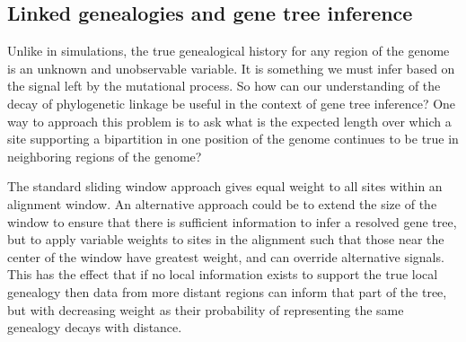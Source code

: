 \documentclass[11pt]{article}
\begin{document}


 
\subsection{Linked genealogies and gene tree inference}

Unlike in simulations, the true genealogical history for any region of the genome is an unknown and unobservable variable. It is something we must infer based on the signal left by the mutational process. So how can our understanding of the decay of phylogenetic linkage be useful in the context of gene tree inference? One way to approach this problem is to ask what is the expected length over which a site supporting a bipartition in one position of the genome continues to be true in neighboring regions of the genome? 

The standard sliding window approach gives equal weight to all sites within an alignment window. An alternative approach could be to extend the size of the window to ensure that there is sufficient information to infer a resolved gene tree, but to apply variable weights to sites in the alignment such that those near the center of the window have greatest weight, and can override alternative signals. This has the effect that if no local information exists to support the true local genealogy then data from more distant regions can inform that part of the tree, but with decreasing weight as their probability of representing the same genealogy decays with distance. 
\end{document}
